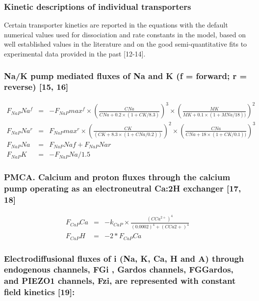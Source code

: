 \documentclass[a4paper]{article}
\newcommand{\med}[1]{M#1}
\newcommand{\cell}[1]{C#1}
\newcommand{\MNa}{\med{Na}}
\newcommand{\MK}{\med{K}}
\newcommand{\CNa}{\cell{Na}}
\newcommand{\CK}{\cell{K}}
\newcommand{\CCatp}{\cell{Ca^{2+}}}
\newcommand{\CCa}{\cell{Ca}}
\newcommand{\F}[2]{F_{#1}#2}
\newcommand{\kk}[2]{k_{#1}#2}
\begin{document}
\subsubsection{Kinetic descriptions of individual transporters}
Certain transporter kinetics are reported in the equations with the default numerical values used for dissociation and rate constants in the model, based on well established values in the literature and on the good semi-quantitative fits to experimental data provided in the past [12-14].  

\setcounter{equation}{0}
\renewcommand{\theequation}{11.\alph{equation}}


\subsubsection{Na/K pump mediated fluxes of Na and K (f = forward; r = reverse) [15, 16]}

\begin{eqnarray}
\F{NaP}{Na}^f  &=& -\F{NaP}{max}^f\times\left(\frac{\CNa}{\CNa + 0.2\times(1 + \CK/8.3)}\right)^3 \times\left(\frac{\MK}{\MK + 0.1\times(1 + \MNa/18))}\right)^2 \\
\F{NaP}{Na}^r  &=& \F{NaP}{max}^r\times\left(\frac{\CK}{(\CK + 8.3\times(1 + \CNa/0.2))}\right)^2\times\left(\frac{\CNa}{\CNa + 18\times(1 + \CK/0.1))}\right)^3 \\
\F{NaP}{Na} &=& \F{NaP}{Naf} + \F{NaP}{Nar} \\
\F{NaP}{K} &=& -\F{NaP}{Na}/1.5
\end{eqnarray}

\subsubsection{PMCA. Calcium and proton fluxes through the calcium pump operating as an electroneutral Ca:2H exchanger  [17, 18]}

\setcounter{equation}{0}
\renewcommand{\theequation}{12.\alph{equation}}

\begin{eqnarray}
\F{CaP}{Ca} &=& -\kk{CaP}{}\times\frac{(\CCatp)^4}{(0.0002)^4 + (\CCa2+)^4}\\
\F{CaP}{H} &=& -2*\F{CaP}{Ca}
\end{eqnarray}

\subsubsection{Electrodiffusional fluxes of i (Na, K, Ca, H and A) through endogenous channels, FGi , Gardos channels, FGGardos, and PIEZO1 channels, Fzi, are represented with constant field kinetics [19]: }
\end{document}
